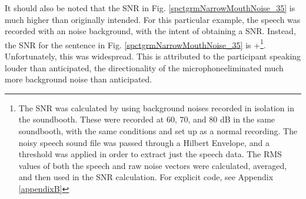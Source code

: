 It should also be noted that the SNR in Fig. \ref{spctgrmNarrowMouthNoise_35} is much higher than originally intended.  For this particular example, the speech was recorded with an \DIFdelbegin {}\DIFdelend \DIFaddbegin {}\DIFaddend noise background, with the intent of obtaining a \DIFdelbegin {}\DIFdelend \DIFaddbegin {}\DIFaddend SNR.  Instead, the SNR for the sentence in Fig. \ref{spctgrmNarrowMouthNoise_35} is +\DIFdelbegin {}\DIFdelend \DIFaddbegin {}\DIFaddend \footnote{The SNR was calculated by using background noises recorded in isolation in the soundbooth.  These were recorded at 60, 70, and 80 dB in the same soundbooth, with the same conditions and set up as a normal recording.  The noisy speech sound file was passed through a Hilbert Envelope, and a threshold was applied in order to extract just the speech data.  The RMS values of both the speech and raw noise vectors were calculated, averaged, and then used in the SNR calculation.  For explicit code, see Appendix \DIFdelbegin {}\DIFdelend \ref{appendixB}}.  Unfortunately, this was widespread. This is attributed to \DIFdelbegin {}\DIFdelend \DIFaddbegin {}\DIFaddend the participant speaking louder than anticipated, \DIFdelbegin {}\DIFdelend the directionality of the microphone\DIFdelbegin {}\DIFdelend \DIFaddbegin {}\DIFaddend eliminated much more background noise than anticipated.



\DIFdelbegin %
{%
}
{%
}
{%
}

